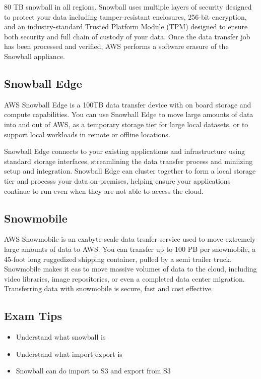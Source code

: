 \documentclass{article}
\begin{document}
80 TB snowball in all regions. Snowball uses multiple layers of security designed to protect your data including tamper-resistant enclosures, 256-bit encryption, and an industry-standard Trusted Platform Module (TPM) designed to ensure both security and full chain of custody of your data. Once the data transfer job has been processed and verified, AWS performs a software erasure of the Snowball appliance.

\subsection{Snowball Edge}
AWS Snowball Edge is a 100TB data transfer device with on board storage and compute capabilities. You can use Snowball Edge to move large amounts of data into and out of AWS, as a temporary storage tier for large local datasets, or to support local workloads in remote or offline locations.

Snowball Edge connects to your existing applications and infrastructure using standard storage interfaces, streamlining the data transfer process and miniizing setup and integration. Snowball Edge can cluster together to form a local storage tier and processs your data on-premises, helping ensure your applications continue to run even when they are not able to access the cloud.

\subsection{Snowmobile}
AWS Snowmobile is an exabyte scale data trsnfer service used to move extremely large amounts of data to AWS. You can transfer up to 100 PB per snowmobile, a 45-foot long ruggedized shipping container, pulled by a semi trailer truck. Snowmobile makes it eas to move massive volumes of data to the cloud, including video libraries, image repositories, or even a completed data center migration. Transferring data with snowmobile is secure, fast and cost effective.

\subsection*{Exam Tips}
\begin{itemize}
\item
Understand what snowball is

\item
Understand what import export is

\item
Snowball can do import to S3 and export from S3
\end{itemize}
\end{document}
